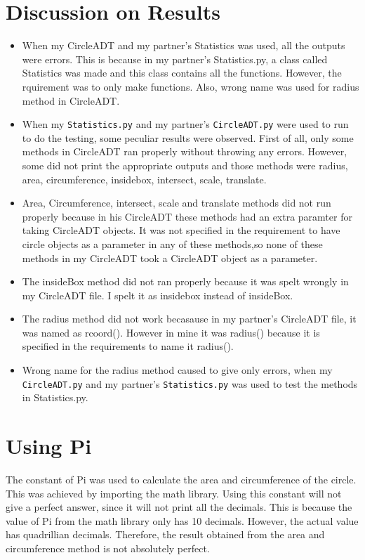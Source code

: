 \documentclass[12pt]{article}
\begin{document}
\section{Discussion on Results} \label{DisscusionSect}
\begin{itemize}
\item When my CircleADT and my partner's Statistics was used, all the outputs were errors. 
This is because in my partner's Statistics.py, a class called Statistics was made and this class contains all the functions. However, the rquirement was to only  make functions. Also, wrong name was used for radius method in CircleADT.

\item When my {\tt Statistics.py} and my partner's {\tt CircleADT.py} were used to run to do the testing, some peculiar results were observed. First of all, only some methods in CircleADT ran properly without throwing any errors. However, some did not print the appropriate
outputs and those methods were radius, area, circumference, insidebox, intersect, scale, translate. 
\item Area, Circumference, intersect, scale and translate methods did not run properly because in his CircleADT these methods had an extra paramter for taking CircleADT objects.
It was not specified in the requirement to have circle objects as a parameter in any of these methods,so none of these methods in my CircleADT took a CircleADT object as a parameter. 
\item The insideBox method did not ran properly because it was spelt wrongly in my CircleADT file.
I spelt it as insidebox instead of insideBox. 
\item The radius method did not work becasause in my partner's CircleADT file, it was named as rcoord(). However in mine it was radius() because it is specified in the requirements to name it radius(). 
\item Wrong name for the radius method caused to give only errors, when my {\tt CircleADT.py} and my partner's {\tt Statistics.py} was used to test the methods in Statistics.py. 
\end{itemize}

\newpage
\section{Using Pi} \label{PiSect}
The constant of Pi was used to calculate the area and circumference of the circle. This was achieved by importing the math library. Using this constant will not give a perfect answer, since it will not print all the decimals. 
This is because the value of Pi from the math library only has 10 decimals. However, the actual value  has quadrillian decimals. Therefore, the result obtained from the area and circumference method is not absolutely perfect. 
\end{document}

